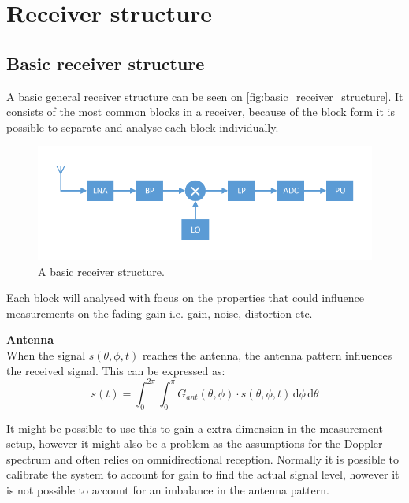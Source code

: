 \chapter{Receiver structure}

\section{Basic receiver structure}
\label{basic_rev_struct}
A basic general receiver structure can be seen on \autoref{fig:basic_receiver_structure}. It consists of the most common blocks in a receiver, because of the block form it is possible to separate and analyse each block individually. 

\begin{figure}[H]
\centering
\includegraphics[width= \textwidth]{figures/Receiver.pdf}
\caption{A basic receiver structure.}
\label{fig:basic_receiver_structure}
\end{figure}

Each block will analysed with focus on the properties that could influence measurements on the fading gain i.e. gain, noise, distortion etc.

\textbf{Antenna}\\
When the signal $s(\theta,\phi,t)$ reaches the antenna, the antenna pattern influences the received signal. This can be expressed as:
\begin{equation}
s(t) = \int_0^{2\pi} \! \int_0^\pi G_{ant}(\theta,\phi)\cdot s(\theta,\phi,t) \,\text{d}\phi \,\text{d}\theta
\end{equation} 
\begin{where}
\end{where}

It might be possible to use this to gain a extra dimension in the measurement setup, however it might also be a problem as the assumptions for the Doppler spectrum and often relies on omnidirectional reception. Normally it is possible to calibrate the system to account for gain to find the actual signal level, however it is not possible to account for an imbalance in the antenna pattern. 


